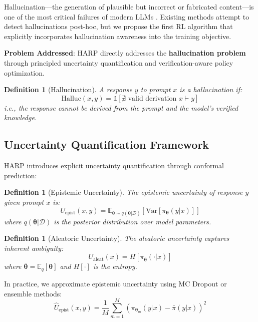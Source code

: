 \documentclass[11pt,a4paper]{article}
\newtheorem{definition}[theorem]{Definition}
\newcommand{\E}{\mathbb{E}}
\newcommand{\Var}{\text{Var}}
\newcommand{\calD}{\mathcal{D}}
\newcommand{\btheta}{\bm{\theta}}
\begin{document}
Hallucination---the generation of plausible but incorrect or fabricated content---is one of the most critical failures of modern LLMs \citep{ji2023survey}. Existing methods attempt to detect hallucinations post-hoc, but we propose the first RL algorithm that explicitly incorporates hallucination awareness into the training objective.

\textbf{Problem Addressed}: HARP directly addresses the \textbf{hallucination problem} through principled uncertainty quantification and verification-aware policy optimization.

\begin{definition}[Hallucination]
A response $y$ to prompt $x$ is a hallucination if:
\begin{equation}
    \text{Halluc}(x, y) = \mathbb{1}\left[\nexists \text{ valid derivation } x \vdash y\right]
\end{equation}
i.e., the response cannot be derived from the prompt and the model's verified knowledge.
\end{definition}

\subsection{Uncertainty Quantification Framework}

HARP introduces explicit uncertainty quantification through conformal prediction:

\begin{definition}[Epistemic Uncertainty]
The epistemic uncertainty of response $y$ given prompt $x$ is:
\begin{equation}
    U_{\text{epist}}(x, y) = \E_{\btheta \sim q(\btheta | \calD)}\left[\Var[\pi_\btheta(y|x)]\right]
\end{equation}
where $q(\btheta | \calD)$ is the posterior distribution over model parameters.
\end{definition}

\begin{definition}[Aleatoric Uncertainty]
The aleatoric uncertainty captures inherent ambiguity:
\begin{equation}
    U_{\text{aleat}}(x) = H[\pi_{\bar{\btheta}}(\cdot | x)]
\end{equation}
where $\bar{\btheta} = \E_{q}[\btheta]$ and $H[\cdot]$ is the entropy.
\end{definition}

In practice, we approximate epistemic uncertainty using MC Dropout or ensemble methods:
\begin{equation}
    \hat{U}_{\text{epist}}(x, y) = \frac{1}{M}\sum_{m=1}^M \left(\pi_{\btheta_m}(y|x) - \bar{\pi}(y|x)\right)^2
\end{equation}
\end{document}
